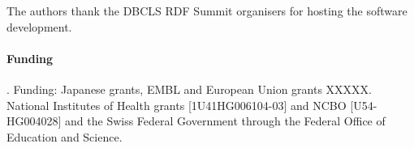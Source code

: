\documentclass{bioinfo}
\begin{document}
The authors thank the DBCLS RDF Summit organisers for hosting the software development.

\paragraph{Funding\textcolon}.
Funding: Japanese grants, EMBL and European Union grants XXXXX. National Institutes of Health grants [1U41HG006104-03] and NCBO [U54-HG004028] and the Swiss Federal Government through the Federal Office of Education and Science.  


%
%
%
%
%
%
%
%
  
\end{document}
